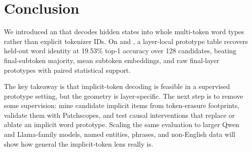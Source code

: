\section{Conclusion}
\label{sec:conclusion}

We introduced an \methodname that decodes hidden states into whole multi-token word types rather than explicit tokenizer IDs. On \qwen and \wikitext, a layer-local prototype table recovers held-out word identity at 19.53\% top-1 accuracy over 128 candidates, beating final-subtoken majority, mean subtoken embeddings, and raw final-layer prototypes with paired statistical support.

The key takeaway is that implicit-token decoding is feasible in a supervised prototype setting, but the geometry is layer-specific. The next step is to remove some supervision: mine candidate implicit items from token-erasure footprints, validate them with Patchscopes, and test causal interventions that replace or ablate an implicit word prototype. Scaling the same evaluation to larger Qwen and Llama-family models, named entities, phrases, and non-English data will show how general the implicit-token lens really is.
